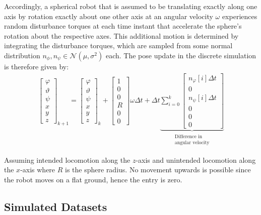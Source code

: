 Accordingly, a spherical robot that is assumed to be translating exactly along one axis by rotation exactly about one other axis at an angular velocity $\omega$  experiences random disturbance torques at each time instant that accelerate the sphere's rotation about the respective axes. 
This additional motion is determined by integrating the disturbance torques, which are sampled from some normal distribution $n_\phi, n_\psi \in \mathcal{N}(\mu,\sigma^2)$ each.  
The pose update in the discrete simulation is therefore given by: 
\begin{align}
	\begin{bmatrix}\varphi\\\vartheta\\\psi\\x\\y\\z\end{bmatrix}_{k+1} = 
	\begin{bmatrix}\varphi\\\vartheta\\\psi\\x\\y\\z\end{bmatrix}_{k} 
	+ \begin{bmatrix}1\\0\\0\\R\\0\\0\end{bmatrix}\omega \Delta t  + \Delta t \underbrace{\sum_{i = 0}^k \begin{bmatrix}n_\varphi[i] \Delta t\\0\\n_\psi[i]\Delta t\\0\\0\\0\end{bmatrix}}_{\substack{\text{Difference in}\\\text{angular velocity}}}
\end{align}

Assuming intended locomotion along the $z$-axis and unintended locomotion along the $x$-axis where $R$ is the sphere radius.
No movement upwards is possible since the robot moves on a flat ground, hence the entry is zero.

\subsection{Simulated Datasets}


